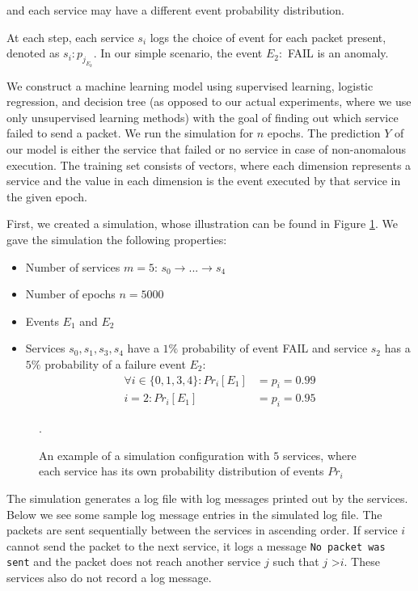 and each service may have a different event probability distribution.

At each step, each service $s_i$ logs the choice of event for each packet present, denoted as $s_i: p_{j_{E_k}}$. In our simple scenario, the event $E_2:$ FAIL is an anomaly. 

We construct a machine learning model using supervised learning, logistic regression, and decision tree (as opposed to our actual experiments, where we use only unsupervised learning methods) with the goal of finding out which service failed to send a packet. We run the simulation for $n$ epochs. The prediction $Y$ of our model is either the service that failed or no service in case of non-anomalous execution. The training set consists of vectors, where each dimension represents a service and the value in each dimension is the event executed by that service in the given epoch. 

First, we created a simulation, whose illustration can be found in Figure \ref{figure:simulation}. We gave the simulation the following properties: 

\begin{itemize}
    \item Number of services $m = 5$: $s_0 \rightarrow ... \rightarrow s_{4}$
    \item Number of epochs $n = 5000$
    \item Events $E_1$ and $E_2$
    \item Services $s_0, s_1, s_3, s_4$ have a $1\%$ probability of event FAIL and service $s_2$ has a $5\%$ probability of a failure event $E_2$:
    \begin{align*}
        \forall i \in \{0, 1, 3, 4\}: Pr_i[E_1] &= p_i = 0.99 \\
        i = 2: Pr_i[E_1] &= p_i = 0.95
    \end{align*}
\end{itemize}

\begin{figure}\centering
     
	\caption{An example of a simulation configuration with $5$ services, where each service has its own probability distribution of events $Pr_i$}.
	\label{figure:simulation}
\end{figure}

The simulation generates a log file with log messages printed out by the services. Below we see some sample log message entries in the simulated log file. The packets are sent sequentially between the services in ascending order. If service $i$ cannot send the packet to the next service, it logs a message \texttt{No packet was sent} and the packet does not reach another service $j$ such that $j$ >$i$. These services also do not record a log message. 

